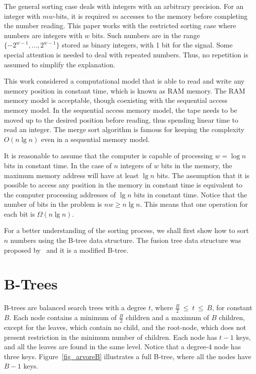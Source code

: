 \documentclass[11pt]{article}
\begin{document}
The general sorting case deals with integers with an arbitrary precision. For an integer with $mw$-bits, it is required $m$ accesses to the memory before completing the number reading. This paper works with the restricted sorting case where numbers are integers with $w$ bits. Such numbers are in the range $\{-2^{w-1},\ldots,2^{w-1}\}$  stored as binary integers, with 1 bit for the signal. Some special attention is needed to deal with repeated numbers. Thus, no repetition is assumed to simplify the explanation.






This work considered a computational model that is able to read and write any memory position in constant time, which is known as RAM memory. The RAM memory model is acceptable, though coexisting with the sequential access memory model. In the sequential access memory model, the tape needs to be moved up to the desired position before reading, thus spending linear time to read an integer. The merge sort algorithm is famous for keeping the complexity $O(n\lg n)$ even in a sequential memory model.





It is reasonable to assume that the computer is capable of processing $w=\log n$ bits in constant time. In the case of $n$ integers of $w$ bits in the memory, the maximum memory address will have at least $\lg n$ bits. The assumption that it is possible to access any position in the memory in constant time is equivalent to the computer processing 
addresses of $\lg n$ bits in constant time. Notice that the number of bits in the problem is $nw \geq n \lg n$. This means that one operation for each bit is $\Omega(n\lg n)$.




For a better understanding of the sorting process, we shall first show how to sort $n$ numbers using the B-tree data structure. The fusion tree data structure was proposed by~\cite{fredman} and it is a modified B-tree.




\section{B-Trees}

B-trees are balanced search trees with a degree $t$, where $\frac{B}{2}~\leq~t~\leq~B$, for constant $B$. Each node contains a minimum of $\frac{B}{2}$ children and a maximum of $B$ children, except for the leaves, which contain no child, and the root-node, which does not present restriction in the minimum number of children. Each node has $t-1$ keys, and all the leaves are found in the same level. Notice that a degree-4 node has three keys. Figure~\ref{fig_arvoreB} illustrates a full B-tree, where all the nodes have $B - 1$ keys.
\end{document}
